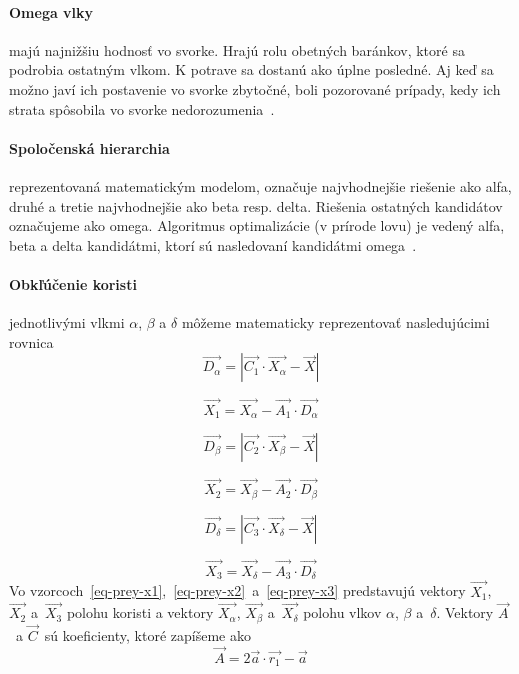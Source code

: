 \documentclass[a4paper,slovak,12pt,appendix]{article}
\begin{document}
\paragraph{Omega vlky} majú najnižšiu hodnosť vo svorke. Hrajú rolu obetných
baránkov, ktoré sa podrobia ostatným vlkom. K potrave sa dostanú ako úplne
posledné. Aj keď sa možno javí ich postavenie vo svorke zbytočné, boli
pozorované prípady, kedy ich strata spôsobila vo svorke
nedorozumenia~\cite{Seeley1991}.

\paragraph{Spoločenská hierarchia} reprezentovaná matematickým modelom,
označuje najvhodnejšie riešenie ako alfa, druhé a tretie najvhodnejšie ako beta
resp. delta. Riešenia ostatných kandidátov označujeme ako omega. Algoritmus
optimalizácie (v prírode lovu) je vedený alfa, beta a delta kandidátmi, ktorí
sú nasledovaní kandidátmi omega~\cite{Seeley1991}.

\paragraph{Obkľúčenie koristi} jednotlivými vlkmi $\alpha$, $\beta$ a $\delta$
môžeme matematicky reprezentovať nasledujúcimi rovnica
\begin{equation}
  \vec{D_\alpha} = | \vec{C_1} \cdot \vec{X_\alpha} - \vec{X} |
  \label{eq-prey-alpha}
\end{equation}

\begin{equation}
  \vec{X_1} = \vec{X_\alpha} - \vec{A_1} \cdot \vec{D_\alpha}
  \label{eq-prey-x1}
\end{equation}

\begin{equation}
  \vec{D_\beta} = | \vec{C_2} \cdot \vec{X_\beta} - \vec{X} |
  \label{eq-prey-beta}
\end{equation}

\begin{equation}
  \vec{X_2} = \vec{X_\beta} - \vec{A_2} \cdot \vec{D_\beta}
  \label{eq-prey-x2}
\end{equation}

\begin{equation}
  \vec{D_\delta} = | \vec{C_3} \cdot \vec{X_\delta} - \vec{X} |
  \label{eq-prey-delta}
\end{equation}

\begin{equation}
  \vec{X_3} = \vec{X_\delta} - \vec{A_3} \cdot \vec{D_\delta}
  \label{eq-prey-x3}
\end{equation}
Vo vzorcoch~\ref{eq-prey-x1},~\ref{eq-prey-x2}~a~\ref{eq-prey-x3} predstavujú
vektory $\vec{X_1}$, $\vec{X_2}$ a $\vec{X_3}$ polohu koristi a vektory
$\vec{X_\alpha}$, $\vec{X_\beta}$ a $\vec{X_\delta}$ polohu vlkov
$\alpha$, $\beta$ a $\delta$. Vektory $\vec{A}$ a $\vec{C}$ sú koeficienty,
ktoré zapíšeme ako
\begin{equation}
  \vec{A} = 2\vec{a} \cdot \vec{r_1} - \vec{a}
  \label{eq-prey-a}
\end{equation}
\end{document}
